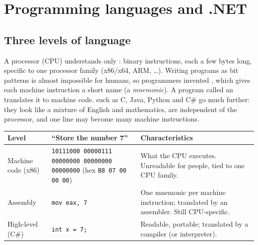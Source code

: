 \section{Programming languages and .NET}\label{sec:languages}

\subsection{Three levels of language}
A processor (CPU) understands only : binary instructions, each a few bytes long, specific to one processor family (x86/x64, ARM, \dots). Writing programs as bit patterns is almost impossible for humans, so programmers invented , which gives each machine instruction a short name (a \emph{mnemonic}). A program called an  translates it to machine code.  such as C, Java, Python and C\# go much further: they look like a mixture of English and mathematics, are independent of the processor, and one line may become many machine instructions.

\begin{center}\small
\begin{tabularx}{\linewidth}{>{\raggedright\arraybackslash}p{31mm}>{\raggedright\arraybackslash}p{50mm}L}
\toprule
\textbf{Level} & \textbf{``Store the number 7''} & \textbf{Characteristics}\\ \midrule
Machine code (x86) & \texttt{10111000 00000111 00000000 00000000 00000000} (hex \texttt{B8 07 00 00 00}) & What the CPU executes. Unreadable for people, tied to one CPU family.\\
Assembly & \texttt{mov eax, 7} & One mnemonic per machine instruction; translated by an assembler. Still CPU-specific.\\
High-level (C\#) & \texttt{int x = 7;} & Readable, portable; translated by a compiler (or interpreter).\\ \bottomrule
\end{tabularx}
\end{center}

